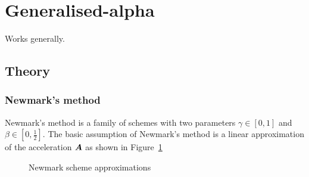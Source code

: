 \section{Generalised-alpha}

Works generally.

\subsection{Theory}

\subsubsection{Newmark's method}

Newmark's method is a family of schemes with two parameters $\gamma\in[0,1]$
and $\beta\in[0,\frac{1}{2}]$. The basic assumption of Newmark's method is a linear approximation of the acceleration $\boldsymbol{A}$ as shown in Figure~\ref{fig:lindyn-newmark}
\begin{figure}[H]
\begin{center}
  \caption{Newmark scheme approximations}
  \label{fig:lindyn-newmark}
\end{center}
\end{figure}
